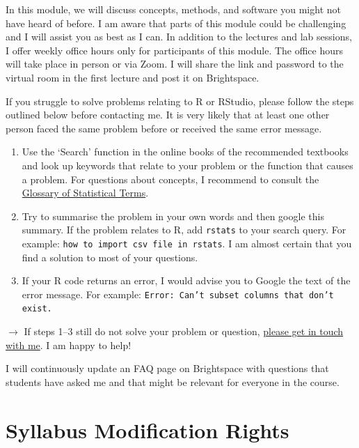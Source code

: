 \documentclass[abstract=on,parskip=full,headings=standardclasses,fontsize=11pt,paper=a4]{scrartcl}
\begin{document}
In this module, we will discuss concepts, methods, and software you might not have heard of before. I am  aware that parts of this module could be challenging and I will assist you as best as I can. In addition to the lectures and lab sessions, I  offer weekly office hours only  for  participants of this module. The office hours will take place in person or via Zoom. I will share the link and password to the virtual room in the first lecture and post it on Brightspace. 

If you struggle to solve problems relating to \textsf{R} or RStudio, please follow the steps outlined below before contacting me. It is very likely that at least one other person faced the same problem before or received the same error message. %
\begin{enumerate}
\item Use the `Search' function in the online books of the recommended textbooks \autocite{ismay20,wickham17,healy19} and look up keywords that relate to your problem or the function that causes a problem. For questions about concepts, I recommend to consult the \href{https://hbiostat.org/doc/glossary.pdf}{Glossary of Statistical Terms}.
\item Try to summarise the problem in your own words and then google this summary. If the problem relates to \textsf{R}, add \texttt{rstats} to your search query. For example: \texttt{how to import csv file in rstats}. I am almost certain that you find a solution to most of your questions. 
\item If your \textsf{R} code returns an error, I would advise you to Google the text of the error message.  For example: \texttt{Error: Can't subset columns that don't exist.}
\end{enumerate}

$\longrightarrow$ If steps 1--3 still do not solve your problem or question, \href{mailto:stefan.mueller@ucd.ie}{please get in touch with me}.  I am happy to help!

I will continuously update an FAQ page on Brightspace with questions that students have asked me and that might be relevant for everyone in the course. 



\section*{Syllabus Modification Rights}
\end{document}
